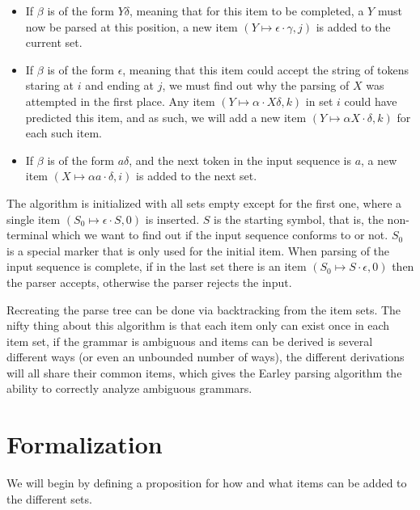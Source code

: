 		\begin{itemize}
			\item
				If $\beta$ is of the form $Y\delta$, meaning that for this item
				to be completed, a $Y$ must now be parsed at this position, a
				new item $(Y \mapsto \epsilon \cdot \gamma, j)$ is added to the
				current set.

			\item
				If $\beta$ is of the form $\epsilon$, meaning that this item
				could accept the string of tokens staring at $i$ and ending at
				$j$, we must find out why the parsing of $X$ was attempted in
				the first place. Any item $(Y \mapsto \alpha \cdot X\delta, k)$
				in set $i$  could have predicted this item, and as such, we
				will add a new item $(Y \mapsto \alpha X \cdot \delta, k)$ for
				each such item.

			\item
				If $\beta$ is of the form $a\delta$, and the next token in the
				input sequence is $a$, a new item
				$(X \mapsto \alpha a \cdot \delta, i)$ is added to the next
				set.

		\end{itemize}

		The algorithm is initialized with all sets empty except for the first
		one, where a single item $(S_0 \mapsto \epsilon \cdot S, 0)$ is
		inserted.  $S$ is the starting symbol, that is, the non-terminal which
		we want to find out if the input sequence conforms to or not. $S_0$ is
		a special marker that is only used for the initial item. When parsing
		of the input sequence is complete, if in the last set there is an item
		$(S_0 \mapsto S \cdot \epsilon, 0)$ then the parser accepts, otherwise
		the parser rejects the input.

		Recreating the parse tree can be done via backtracking from the item
		sets. The nifty thing about this algorithm is that each item only can
		exist once in each item set, if the grammar is ambiguous and items can
		be derived is several different ways (or even an unbounded number of
		ways), the different derivations will all share their common items,
		which gives the Earley parsing algorithm the ability to correctly
		analyze ambiguous grammars.

	\section{Formalization}

		We will begin by defining a proposition for how and what items can be
		added to the different sets.

